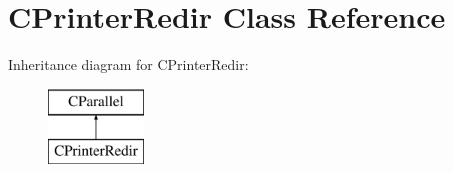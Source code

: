 \hypertarget{classCPrinterRedir}{\section{C\-Printer\-Redir Class Reference}
\label{classCPrinterRedir}
}
Inheritance diagram for C\-Printer\-Redir\-:\begin{figure}[H]
\begin{center}
\leavevmode
\includegraphics[height=2.000000cm]{classCPrinterRedir}
\end{center}
\end{figure}
